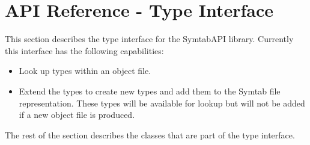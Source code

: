 \section{API Reference - Type Interface}
This section describes the type interface for the SymtabAPI library. Currently this interface has the following capabilities:
\begin{itemize}
    \item Look up types within an object file.
    \item Extend the types to create new types and add them to the Symtab file representation. These types will be available for lookup but will not be added if a new object file is produced.
\end{itemize}

The rest of the section describes the classes that are part of the type interface.


